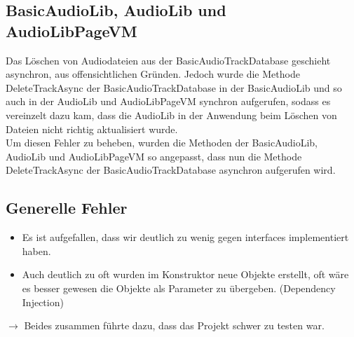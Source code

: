 \documentclass[../validierung.tex]{subfiles}
\begin{document}
	\subsection{BasicAudioLib, AudioLib und AudioLibPageVM}
		Das Löschen von Audiodateien aus der BasicAudioTrackDatabase geschieht asynchron, aus offensichtlichen Gründen. Jedoch wurde die Methode
		DeleteTrackAsync der BasicAudioTrackDatabase in der BasicAudioLib und so auch in der AudioLib und AudioLibPageVM synchron aufgerufen, sodass es
		vereinzelt dazu kam, dass die AudioLib in der Anwendung beim Löschen von Dateien nicht richtig aktualisiert wurde.\\ Um diesen Fehler zu beheben,
		wurden die Methoden der BasicAudioLib, AudioLib und AudioLibPageVM so angepasst, dass nun die Methode DeleteTrackAsync der BasicAudioTrackDatabase
		asynchron aufgerufen wird.

	\subsection{Generelle Fehler}
		\begin{itemize}
			\item Es ist aufgefallen, dass wir deutlich zu wenig gegen interfaces implementiert haben.
			\item Auch deutlich zu oft wurden im Konstruktor neue Objekte erstellt, oft wäre es besser gewesen die Objekte als Parameter zu übergeben. (Dependency Injection)
		\end{itemize}
		$\rightarrow$ Beides zusammen führte dazu, dass das Projekt schwer zu testen war.
\end{document}
